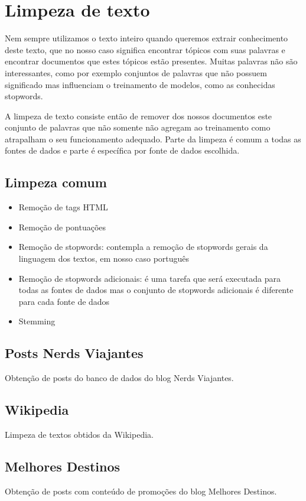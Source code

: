 \section{Limpeza de texto}

Nem sempre utilizamos o texto inteiro quando queremos extrair conhecimento deste texto, que no nosso caso significa encontrar tópicos com suas palavras e 
encontrar documentos que estes tópicos estão presentes. Muitas palavras não são interessantes, como por exemplo conjuntos de palavras que não possuem 
significado mas influenciam o treinamento de modelos, como as conhecidas stopwords. 

A limpeza de texto consiste então de remover dos nossos documentos 
este conjunto de palavras que não somente não agregam ao treinamento como atrapalham o seu funcionamento adequado. Parte da limpeza é comum a todas as 
fontes de dados e parte é específica por fonte de dados escolhida.

\subsection{Limpeza comum}

\begin{itemize}
    \item Remoção de tags HTML
    \item Remoção de pontuações
    \item Remoção de stopwords: contempla a remoção de stopwords gerais da linguagem dos textos, em nosso caso português
    \item Remoção de stopwords adicionais: é uma tarefa que será executada para todas as fontes de dados mas o conjunto de stopwords adicionais é diferente para cada fonte de dados
    \item Stemming
\end{itemize}

\subsection{Posts Nerds Viajantes}

Obtenção de posts do banco de dados do blog Nerds Viajantes.

\subsection{Wikipedia}

Limpeza de textos obtidos da Wikipedia.

\subsection{Melhores Destinos}

Obtenção de posts com conteúdo de promoções do blog Melhores Destinos.
